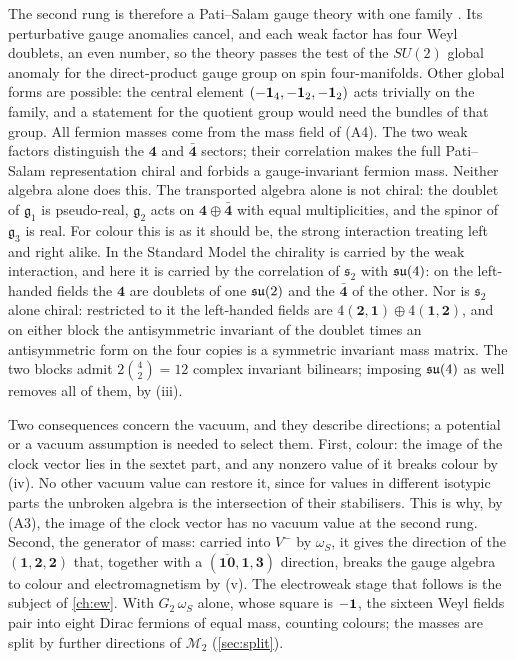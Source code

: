 The second rung is therefore a Pati--Salam gauge theory with one family \cite{PatiSalam}. Its perturbative gauge anomalies cancel, and each
weak factor has four Weyl doublets, an even number, so the theory passes the test of the $SU(2)$ global anomaly \cite{Witten82} for the
direct-product gauge group on spin four-manifolds. Other global forms are possible: the central element $(-\mathbf 1_4,-\mathbf 1_2,-\mathbf 1_2)$ acts
trivially on the family, and a statement for the quotient group would need the bundles of that group. All fermion masses come from the mass
field of (A4). The two weak factors distinguish the $\mathbf4$ and $\bar{\mathbf4}$ sectors; their correlation makes the full Pati--Salam
representation chiral and forbids a gauge-invariant fermion mass. Neither algebra alone does this. The transported algebra alone is not chiral: the doublet of $\mathfrak g_1$ is
pseudo-real, $\mathfrak g_2$ acts on $\mathbf4\oplus\bar{\mathbf4}$ with equal multiplicities, and the spinor of $\mathfrak g_3$ is real. For
colour this is as it should be, the strong interaction treating left and right alike. In the Standard Model the chirality is carried by the
weak interaction, and here it is carried by the correlation of $\mathfrak s_2$ with $\mathfrak{su}(4)$: on the left-handed fields the $\mathbf4$ are
doublets of one $\mathfrak{su}(2)$ and the $\bar{\mathbf4}$ of the other. Nor is $\mathfrak s_2$ alone chiral: restricted to it the left-handed fields are
$4(\mathbf2,\mathbf1)\oplus4(\mathbf1,\mathbf2)$, and on either block the antisymmetric invariant of the doublet times an antisymmetric form
on the four copies is a symmetric invariant mass matrix. The two blocks admit $2\binom42=12$ complex invariant bilinears; imposing $\mathfrak{su}(4)$
as well removes all of them, by (iii).

Two consequences concern the vacuum, and they describe directions; a potential or a vacuum assumption is needed to select them. First,
colour: the image of the clock vector lies in the sextet part, and any nonzero value of it breaks colour by (iv). No other vacuum value can
restore it, since for values in different isotypic parts the unbroken algebra is the intersection of their stabilisers. This is why, by
(A3), the image of the clock vector has no vacuum value at the second rung. Second, the generator of mass: carried into $V^-$ by $\omega_S$,
it gives the direction of the $(\mathbf1,\mathbf2,\mathbf2)$ that, together with a $(\overline{\mathbf{10}},\mathbf1,\mathbf3)$ direction,
breaks the gauge algebra to colour and electromagnetism by (v). The electroweak stage that follows is the subject of \cref{ch:ew}. With
$G_2\,\omega_S$ alone, whose square is $-\mathbf 1$, the sixteen Weyl fields pair into eight Dirac fermions of equal mass, counting colours; the
masses are split by further directions of $\mathcal M_2$ (\cref{sec:split}).

